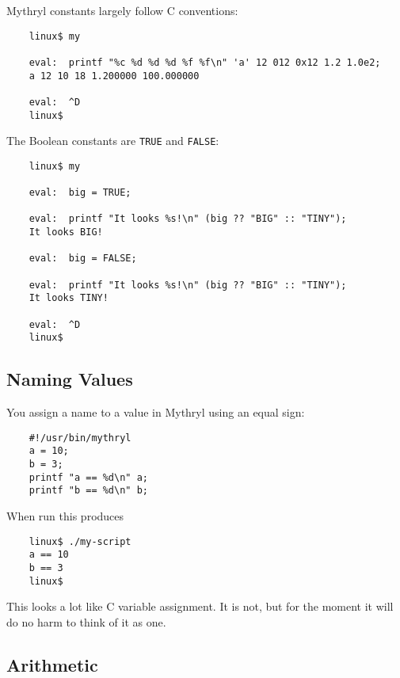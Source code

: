 Mythryl constants largely follow C conventions:

\begin{verbatim}
    linux$ my

    eval:  printf "%c %d %d %d %f %f\n" 'a' 12 012 0x12 1.2 1.0e2;
    a 12 10 18 1.200000 100.000000

    eval:  ^D
    linux$
\end{verbatim}

The Boolean constants are {\tt TRUE} and {\tt FALSE}:

\begin{verbatim}
    linux$ my

    eval:  big = TRUE;

    eval:  printf "It looks %s!\n" (big ?? "BIG" :: "TINY");
    It looks BIG!

    eval:  big = FALSE;

    eval:  printf "It looks %s!\n" (big ?? "BIG" :: "TINY");
    It looks TINY!

    eval:  ^D
    linux$
\end{verbatim}

\cutend*

\subsection{Naming Values}

You assign a name to a value in Mythryl using an equal sign:

\begin{verbatim}
    #!/usr/bin/mythryl
    a = 10;
    b = 3;
    printf "a == %d\n" a;
    printf "b == %d\n" b;
\end{verbatim}

When run this produces

\begin{verbatim}
    linux$ ./my-script
    a == 10
    b == 3
    linux$
\end{verbatim}

This looks a lot like C variable assignment.  It is not, 
but for the moment it will do no harm to think of it as one.

\cutend*

\subsection{Arithmetic}

